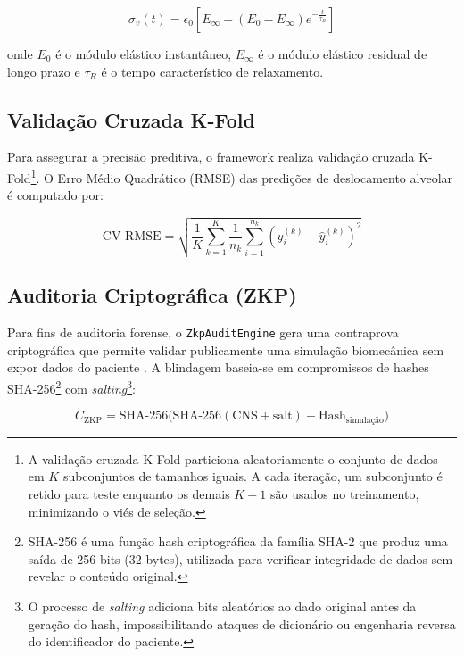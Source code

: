 \begin{equation}
    \sigma_v(t) = \epsilon_0 \left[ E_{\infty} + (E_0 - E_{\infty})
    e^{-\frac{t}{\tau_R}} \right]
    \label{eq:prony}
\end{equation}

onde $E_0$ é o módulo elástico instantâneo, $E_{\infty}$ é o módulo
elástico residual de longo prazo e $\tau_R$ é o tempo característico
de relaxamento.

\subsection{Validação Cruzada K-Fold}

Para assegurar a precisão preditiva, o framework realiza validação
cruzada K-Fold\footnote{A validação cruzada K-Fold particiona
aleatoriamente o conjunto de dados em $K$ subconjuntos de tamanhos
iguais. A cada iteração, um subconjunto é retido para teste enquanto
os demais $K-1$ são usados no treinamento, minimizando o viés de
seleção.}. O Erro Médio Quadrático (RMSE) das predições de
deslocamento alveolar é computado por:

\begin{equation}
    \text{CV-RMSE} = \sqrt{\frac{1}{K} \sum_{k=1}^K
    \frac{1}{n_k} \sum_{i=1}^{n_k}
    \left( y_i^{(k)} - \hat{y}_i^{(k)} \right)^2}
    \label{eq:cvrmse}
\end{equation}

\subsection{Auditoria Criptográfica (ZKP)}

Para fins de auditoria forense, o \texttt{ZkpAuditEngine} gera uma
contraprova criptográfica que permite validar publicamente uma
simulação biomecânica sem expor dados do paciente
\cite{frota2025sus}. A blindagem baseia-se em compromissos de hashes
SHA-256\footnote{SHA-256 é uma função hash criptográfica da família
SHA-2 que produz uma saída de 256 bits (32 bytes), utilizada para
verificar integridade de dados sem revelar o conteúdo original.}
com \textit{salting}\footnote{O processo de \textit{salting} adiciona
bits aleatórios ao dado original antes da geração do hash,
impossibilitando ataques de dicionário ou engenharia reversa do
identificador do paciente.}:

\begin{equation}
    C_{\text{ZKP}} = \text{SHA-256}\Big(
    \text{SHA-256}(\text{CNS} + \text{salt})
    + \text{Hash}_{\text{simulação}} \Big)
    \label{eq:zkp}
\end{equation}

